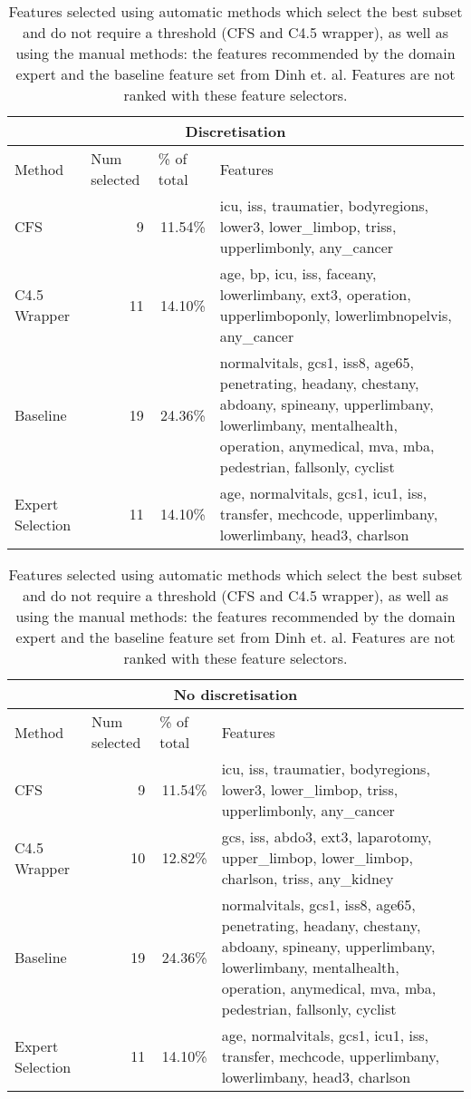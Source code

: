\begin{table}[hbp]
\caption{Features selected using automatic methods which select the best subset and do not require a threshold (CFS and C4.5 wrapper), as well as using the manual methods: the features recommended by the domain expert and the baseline feature set from Dinh et. al. Features are not ranked with these feature selectors.}
\begin{tabular}{|l|r|r|p{8.5cm}|}
\hline
\multicolumn{ 4}{|c|}{Discretisation} \\ \hline
Method & \multicolumn{1}{l|}{Num selected} & \multicolumn{1}{l|}{\% of total} & Features \\ \hline
CFS & 9 & 11.54\% & icu, iss, traumatier, bodyregions, lower3, lower\_limbop, triss, upperlimbonly, any\_cancer \\ \hline
C4.5 Wrapper & 11 & 14.10\% & age, bp, icu, iss, faceany, lowerlimbany, ext3, operation, upperlimboponly, lowerlimbnopelvis, any\_cancer \\ \hline
Baseline & 19 & 24.36\% & normalvitals, gcs1, iss8, age65, penetrating, headany, chestany, abdoany, spineany, upperlimbany, lowerlimbany, mentalhealth, operation, anymedical, mva, mba, pedestrian, fallsonly, cyclist \\ \hline
Expert Selection & 11 & 14.10\% & age, normalvitals, gcs1, icu1, iss, transfer, mechcode, upperlimbany, lowerlimbany, head3, charlson \\ \hline
\end{tabular}
\vspace{1cm}
\vfill
\begin{tabular}{|l|r|r|p{8.5cm}|}
\hline
\multicolumn{ 4}{|c|}{No discretisation} \\ \hline
Method & \multicolumn{1}{l|}{Num selected} & \multicolumn{1}{l|}{\% of total} & Features \\ \hline
CFS & 9 & 11.54\% & icu, iss, traumatier, bodyregions, lower3, lower\_limbop, triss, upperlimbonly, any\_cancer \\ \hline
C4.5 Wrapper & 10 & 12.82\% & gcs, iss, abdo3, ext3, laparotomy, upper\_limbop, lower\_limbop, charlson, triss, any\_kidney \\ \hline
Baseline & 19 & 24.36\% & normalvitals, gcs1, iss8, age65, penetrating, headany, chestany, abdoany, spineany, upperlimbany, lowerlimbany, mentalhealth, operation, anymedical, mva, mba, pedestrian, fallsonly, cyclist \\ \hline
Expert Selection & 11 & 14.10\% & age, normalvitals, gcs1, icu1, iss, transfer, mechcode, upperlimbany, lowerlimbany, head3, charlson \\ \hline
\end{tabular}
\end{table}
